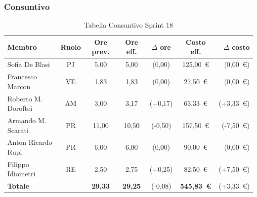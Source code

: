 \subsubsection{Consuntivo}
\begin{table}[H]
    \centering
    \renewcommand{\arraystretch}{1.3}
    \begin{tabularx}{\textwidth}{|X|c|c|c|c|c|r|}
        \hline
        \textbf{Membro} & \textbf{Ruolo} & \textbf{Ore prev.} &
        \textbf{Ore eff.} & \textbf{$\Delta$ ore} &
        \textbf{Costo eff.} & \textbf{$\Delta$ costo} \\
        \hline
        Sofia De Blasi       & PJ & 5,00 & 5,00 & {\color{green}(0,00)}  & 125{,}00~\euro & {\color{green}(0{,}00~\euro)} \\
        Francesco Marcon     & VE & 1,83 & 1,83 & {\color{green}(0,00)} & 27{,}50~\euro  & {\color{green}(0{,}00~\euro)} \\
        Roberto M. Doroftei  & AM & 3,00 & 3,17 & {\color{red}(+0,17)}  & 63{,}33~\euro & {\color{red}(+3{,}33~\euro)} \\
        Armando M. Scarati   & PR & 11,00 & 10,50 & {\color{green}(-0,50)} & 157{,}50~\euro & {\color{green}(-7{,}50~\euro)} \\
        Anton Ricardo Rupi   & PR & 6,00 & 6,00 & {\color{green}(0,00)} & 90{,}00~\euro & {\color{green}(0{,}00~\euro)} \\
        Filippo Idiometri    & RE & 2,50 & 2,75 & {\color{red}(+0,25)} & 82{,}50~\euro & {\color{red}(+7{,}50~\euro)} \\
        \hline
        \textbf{Totale} & & \textbf{29,33} & \textbf{29,25} & {\color{green}(-0,08)} & \textbf{545{,}83~\euro} & {\color{red}(+3{,}33~\euro)} \\
        \hline
    \end{tabularx}
    \caption{Tabella Consuntivo Sprint 18}
\end{table}

